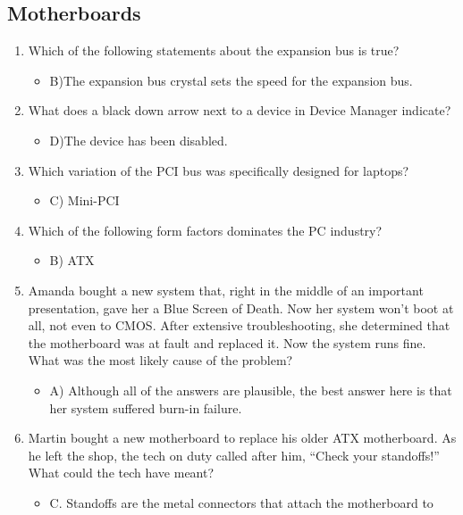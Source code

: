 \documentclass{article}
\begin{document}
\subsection{Motherboards} 
\begin{enumerate}
    \item Which of the following statements about the expansion bus is true?
    \begin{itemize}
        \item B)The expansion bus crystal sets the speed for the expansion bus.
    \end{itemize}
    \item What does a black down arrow next to a device in Device Manager
indicate?
    \begin{itemize}
        \item D)The device has been disabled.
    \end{itemize}
    \item Which variation of the PCI bus was specifically designed for laptops?
    \begin{itemize}
        \item C) Mini-PCI 
    \end{itemize}
    \item Which of the following form factors dominates the PC industry?
    \begin{itemize}
        \item B) ATX 
    \end{itemize}
    \item Amanda bought a new system that, right in the middle of an important
presentation, gave her a Blue Screen of Death. Now her system won’t
boot at all, not even to CMOS. After extensive troubleshooting, she
determined that the motherboard was at fault and replaced it. Now the
system runs fine. What was the most likely cause of the problem?
    \begin{itemize}
        \item A) Although all of the answers are plausible, the best answer here is
that her system suffered burn-in failure.
    \end{itemize}
    \item Martin bought a new motherboard to replace his older ATX
motherboard. As he left the shop, the tech on duty called after him,
“Check your standoffs!” What could the tech have meant?
    \begin{itemize}
        \item C. Standoffs are the metal connectors that attach the motherboard to

\end{itemize}
\end{enumerate}
\end{document}
